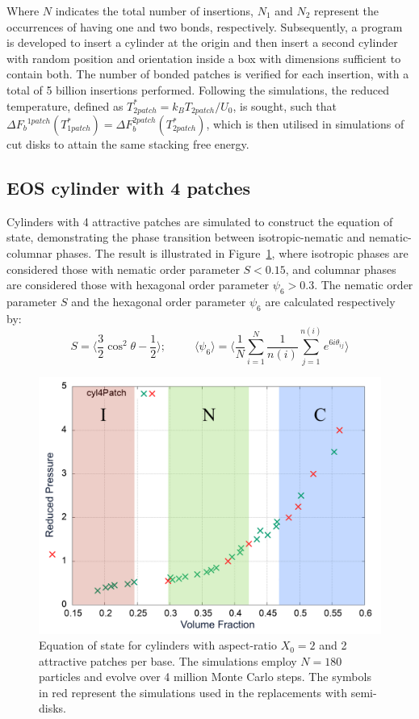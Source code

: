 \documentclass[aip,jcp, amsmath, amssymb, reprint]{revtex4-1}
\begin{document}
Where $N$ indicates the total number of insertions, $N_1$ and $N_2$ represent the occurrences of having one and two
bonds, respectively. Subsequently, a program is developed to insert a cylinder at the origin and then insert a second
cylinder with random position and orientation inside a box with dimensions sufficient to contain both. The number of
bonded patches is verified for each insertion, with a total of 5 billion insertions performed. Following the
simulations, the reduced temperature, defined as $T^*_{2 patch}=k_B T_{2 patch}/U_0$, is sought, such that 
${\Delta F_b}^{1 patch}(T^*_{1 patch})=\Delta F_b^{2 patch}(T^*_{2 patch})$, which is then utilised in simulations of cut disks to attain
the same stacking free energy.

\subsection{EOS cylinder with 4 patches}
Cylinders with 4 attractive patches are simulated to construct the equation of state, demonstrating the phase transition
between isotropic-nematic and nematic-columnar phases. The result is illustrated in Figure~\ref{fig:eos1}, where
isotropic phases are considered those with nematic order parameter $S<0.15$, and columnar phases are considered those
with hexagonal order parameter $\psi_6 > 0.3$. The nematic order parameter $S$ and the hexagonal order parameter $\psi_6
$ are calculated respectively by: 
\begin{equation}  
\label{pordnem}
S= \bigg\langle \frac{3}{2} \cos^2\theta - \frac{1}{2} \bigg\rangle; \; \; \; \; \; \; \; \; \; \langle \psi_6\rangle=\bigg\langle \frac{1}{N} \sum_{i=1}^N \frac{1}{n(i)} \sum_{j=1}^{n(i)}e^{6i\theta_{ij}} \bigg\rangle
\end{equation}


\begin{figure}[h!]
\includegraphics[width=0.86\linewidth]{eos.png}
\caption{\label{fig:eos1} Equation of state for cylinders with aspect-ratio $X_0=2$ and 2 attractive patches per base. The simulations employ $N = 180$ particles and evolve over 4 million Monte Carlo steps. The symbols in red represent the simulations used in the replacements with semi-disks.}
\end{figure}
\end{document}

